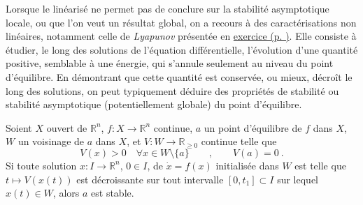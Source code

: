 Lorsque le linéarisé ne permet pas de conclure sur la stabilité
asymptotique locale, ou que l'on veut un résultat global, on a recours à
des caractérisations non linéaires, notamment celle de \emph{Lyapunov}
présentée en \protect\hyperlink{exo_lyap}{exercice (p.
\pageref*{exo_lyap})}. Elle consiste à étudier, le long des solutions de
l'équation différentielle, l'évolution d'une quantité positive,
semblable à une énergie, qui s'annule seulement au niveau du point
d'équilibre. En démontrant que cette quantité est conservée, ou mieux,
décroît le long des solutions, on peut typiquement déduire des
propriétés de stabilité ou stabilité asymptotique (potentiellement
globale) du point d'équilibre.

\hypertarget{stab_decroissance}{}
\begin{theoreme}\label{stab_decroissance}
Soient \(X\) ouvert de \(\mathbb{R}^n\), \(f: X \to \mathbb{R}^n\)
continue, \(a\) un point d'équilibre de \(f\) dans \(X\), \(W\) un
voisinage de \(a\) dans \(X\), et \(V:W\to\mathbb{R}_{\geq 0}\) continue
telle que \[
V(x) > 0 \quad  \forall x\in W\setminus\{a\} \qquad , \qquad V(a)= 0 \ .
\] Si toute solution \(x: I\to \mathbb{R}^n\), \(0\in I\), de
\(\dot x = f(x)\) initialisée dans \(W\) est telle que
\(t\mapsto V(x(t))\) est décroissante sur tout intervalle
\([0,t_1]\subset I\) sur lequel \(x(t)\in W\), alors \(a\) est stable.
\end{theoreme}

